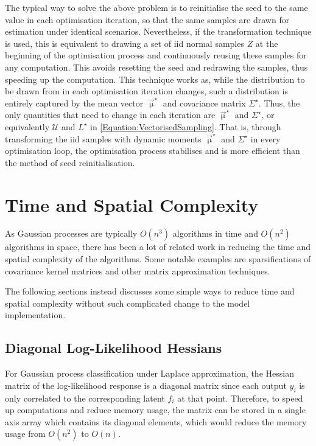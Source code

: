 			The typical way to solve the above problem is to reinitialise the seed to the same value in each optimisation iteration, so that the same samples are drawn for estimation under identical scenarios. Nevertheless, if the transformation technique is used, this is equivalent to drawing a set of iid normal samples $Z$ at the beginning of the optimisation process and continuously reusing these samples for any computation. This avoids resetting the seed and redrawing the samples, thus speeding up the computation. This technique works as, while the distribution to be drawn from in each optimisation iteration changes, such a distribution is entirely captured by the mean vector $\vec{\upmu}^{\star}$ and covariance matrix $\Sigma^{\star}$. Thus, the only quantities that need to change in each iteration are $\vec{\upmu}^{\star}$ and $\Sigma^{\star}$, or equivalently $\mathcal{U}$ and $L^{\star}$ in \eqref{Equation:VectorisedSampling}. That is, through transforming the iid samples with dynamic moments $\vec{\upmu}^{\star}$ and $\Sigma^{\star}$ in every optimisation loop, the optimisation process stabilises and is more efficient than the method of seed reinitialisation.
			
	\section{Time and Spatial Complexity}
	\label{Appendix:ComputationalAspects:TimeComplexity}
	
		As Gaussian processes are typically $O(n^{3})$ algorithms in time and $O(n^{2})$ algorithms in space, there has been a lot of related work in reducing the time and spatial complexity of the algorithms. Some notable examples are sparsifications of covariance kernel matrices and other matrix approximation techniques.
		
		The following sections instead discusses some simple ways to reduce time and spatial complexity without such complicated change to the model implementation.
		
		\subsection{Diagonal Log-Likelihood Hessians}
		\label{Appendix:ComputationalAspects:TimeSpaceComplexity:DiagonalHessians}
					
			For Gaussian process classification under Laplace approximation, the Hessian matrix of the log-likelihood response is a diagonal matrix since each output $y_{i}$ is only correlated to the corresponding latent $f_{i}$ at that point. Therefore, to speed up computations and reduce memory usage, the matrix can be stored in a single axis array which contains its diagonal elements, which would reduce the memory usage from $O(n^{2})$ to $O(n)$.
			
